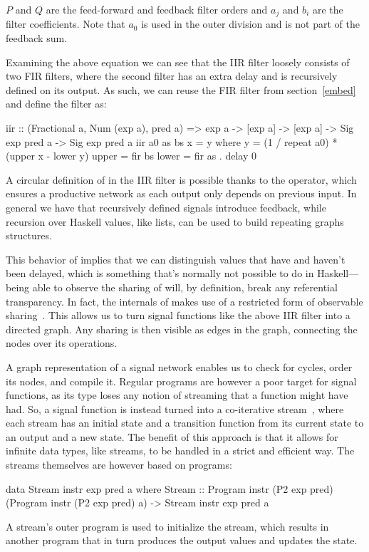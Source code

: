 \documentclass[../paper.tex]{subfiles}
\begin{document}
\noindent $P$ and $Q$ are the feed-forward and feedback filter orders and $a_{j}$ and $b_{i}$ are the filter coefficients. Note that $a_{0}$ is used in the outer division and is not part of the feedback sum.

Examining the above equation we can see that the IIR filter loosely consists of two FIR filters, where the second filter has an extra delay and is recursively defined on its output. As such, we can reuse the FIR filter from section~\ref{embed} and define the filter as:

\begin{code}
iir :: (Fractional a, Num (exp a), pred a) => exp a -> [exp a] -> [exp a]
  -> Sig exp pred a -> Sig exp pred a
iir a0 as bs x = y
  where
    y = (1 / repeat a0) * (upper x - lower y)
    upper = fir bs
    lower = fir as . delay 0
\end{code}

A circular definition of  in the IIR filter is possible thanks to the  operator, which ensures a productive network as each output only depends on previous input. In general we have that recursively defined signals introduce feedback, while recursion over Haskell values, like lists, can be used to build repeating graphs structures.

This behavior of  implies that we can distinguish values that have and haven't been delayed, which is something that's normally not possible to do in Haskell---being able to observe the sharing of  will, by definition, break any referential transparency. In fact, the internals of  makes use of a restricted form of observable sharing~\cite{claessen1999, gill2009}. This allows us to turn signal functions like the above IIR filter into a directed graph. Any sharing is then visible as edges in the graph, connecting the nodes over its operations.

A graph representation of a signal network enables us to check for cycles, order its nodes, and compile it. Regular programs are however a poor target for signal functions, as its type loses any notion of streaming that a function might have had. So, a signal function is instead turned into a co-iterative stream~\cite{caspi1998}, where each stream has an initial state and a transition function from its current state to an output and a new state. The benefit of this approach is that it allows for infinite data types, like streams, to be handled in a strict and efficient way. The streams themselves are however based on programs:

\begin{code}
data Stream instr exp pred a where
  Stream :: Program instr (P2 exp pred) (Program instr (P2 exp pred) a)
    -> Stream instr exp pred a
\end{code}

\noindent A stream's outer program is used to initialize the stream, which results in another program that in turn produces the output values and updates the state.
\end{document}
